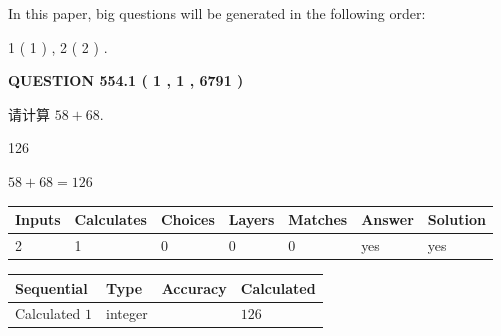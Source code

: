 \documentclass{ctexart}
\begin{document}
In this paper, big questions will be generated in the following order: 
   
   
   1 ( 1 )
 ,
   2 ( 2 )
 .
  
\vspace{0.2in}
  
{\textbf{\Large{QUESTION
554.1 
 ( 1 , 1 , 6791 )
}}}
  
  
 
请计算 $ %
58 +  %
68 $.
 
 
 
\noindent{}
 
 

126
 
 
\noindent{}
 
 

 
 
 
\noindent{}
 
 

$ %
58 +  %
68=   %
126$
 
 
\noindent{}
 
 

 
   
   
   
   
\noindent\begin{tabular}{|l|l|l|l|l|l|l|}
 \hline
Inputs & Calculates & Choices & Layers & Matches & Answer & Solution \\ \hline
 2  & 
 1  & 
 0
  & 
 0  & 
 0  & 
  yes & 
  yes 
  \\ \hline
 \end{tabular}
   
   
   
   
\noindent{}
   
   
  
  
\noindent\begin{tabular}{|l|l|l|l|}
\hline
 Sequential & Type & Accuracy & Calculated \\ 
\hline
 
 
  Calculated $  1 $ & integer &  & 
  $ 126 $ 
 \\  \hline  
 \end{tabular}
   
\end{document}
